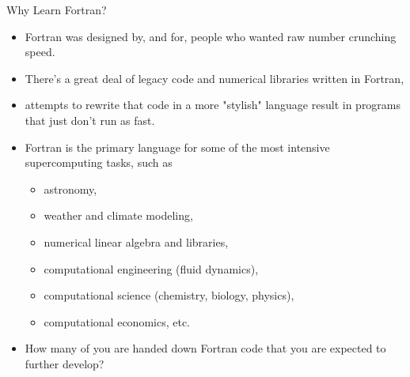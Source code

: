\documentclass[10pt,t]{beamer}
\begin{document}
\begin{frame}{Why Learn Fortran?}
  \begin{itemize}
    \item Fortran was designed by, and for, people who wanted raw number crunching speed. 
    \item There's a great deal of legacy code and numerical libraries written in Fortran,
    \item attempts to rewrite that code in a more "stylish" language result in programs that just don't run as fast.
    \item Fortran is the primary language for some of the most intensive supercomputing tasks, such as 
    \begin{itemize}
      \item astronomy, 
      \item weather and climate modeling, 
      \item numerical linear algebra and libraries, 
      \item computational engineering (fluid dynamics), 
      \item computational science (chemistry, biology, physics), 
      \item computational economics, etc.
    \end{itemize}
    \item How many of you are handed down Fortran code that you are expected to further develop?
  \end{itemize}
\end{frame}

\end{document}
